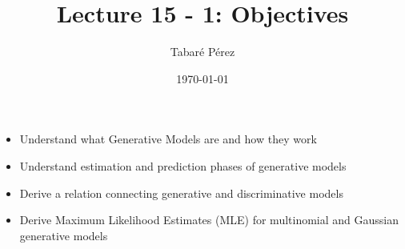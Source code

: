 \documentclass[a4paper, 12pt]{article}
\author{Tabaré Pérez}
\date{\today}
\title{Lecture 15 - 1: Objectives}
\begin{document}
\maketitle
\begin{itemize}
\item Understand what Generative Models are and how they work
\item Understand estimation and prediction phases of generative models
\item Derive a relation connecting generative and discriminative models
\item Derive Maximum Likelihood Estimates (MLE) for multinomial and Gaussian
generative models
\end{itemize}
\end{document}

